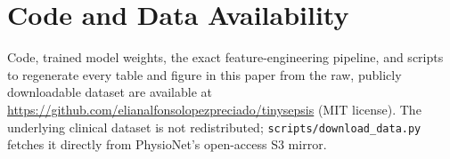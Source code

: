 \documentclass[11pt]{article}
\begin{document}
\section*{Code and Data Availability}
Code, trained model weights, the exact feature-engineering pipeline, and scripts to regenerate every table and figure in this paper from the raw, publicly downloadable dataset are available at \url{https://github.com/elianalfonsolopezpreciado/tinysepsis} (MIT license). The underlying clinical dataset is not redistributed; \texttt{scripts/download\_data.py} fetches it directly from PhysioNet's open-access S3 mirror.



\end{document}
